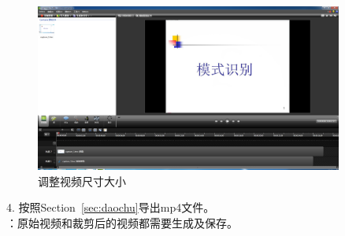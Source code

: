 \documentclass[12pt]{article}
\begin{document}
         \begin{figure}
    \centering
    \includegraphics[width=0.9\textwidth]{fig14.png}
    \caption{调整视频尺寸大小}
    \label{fig:fig14}
    \end{figure}
4. 按照Section~\ref{sec:daochu}导出mp4文件。\\
{\color{blue}{注}}：原始视频和裁剪后的视频都需要生成及保存。



\end{document}
